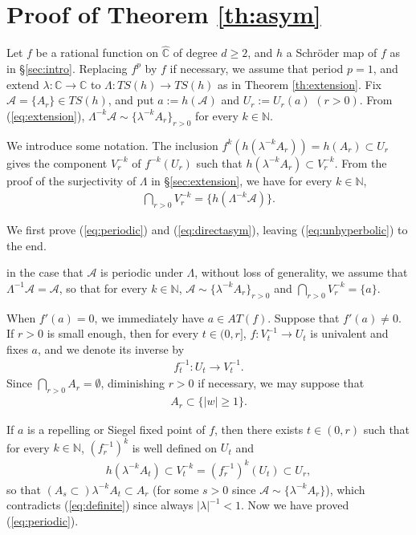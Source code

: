 \documentclass[a4paper,12pt]{amsart}
\theoremstyle{plain}
\theoremstyle{definition}
\theoremstyle{remark}
\numberwithin{equation}{section}
\begin{document}
\section{Proof of Theorem \ref{th:asym}}\label{sec:Schroder}

Let $f$ be a rational function on ${\hat{\mathbb{C}}}$ of degree $d\ge 2$,
and $h$ a Schr\"oder map of $f$ as in \S \ref{sec:intro}.
Replacing $f^p$ by $f$ if necessary, 
we assume that period $p=1$, and
extend $\lambda:{\mathbb{C}}\to{\mathbb{C}}$ to $\Lambda:{\mathit{TS}}(h)\to{\mathit{TS}}(h)$ as
in Theorem \ref{th:extension}.
Fix $\mathcal{A}=\{A_r\}\in{\mathit{TS}}(h)$, and 
put $a:=h(\mathcal{A})$ and $U_r:=U_r(a)$ $(r>0)$.
From (\ref{eq:extension}),
$\Lambda^{-k}\mathcal{A}\sim\{\lambda^{-k}A_r\}_{r>0}$ for every $k\in{\mathbb{N}}$.

We introduce some notation.
The inclusion $f^k(h(\lambda^{-k}A_r))=h(A_r)\subset U_r$
gives the component $V^{-k}_r$ of $f^{-k}(U_r)$ such that 
$h(\lambda^{-k}A_r)\subset V^{-k}_r$. From the proof of 
the surjectivity of $\Lambda$ in \S \ref{sec:extension},
we have for every $k\in{\mathbb{N}}$,
\begin{gather*}
 \bigcap_{r>0}V^{-k}_r=\{h(\Lambda^{-k}\mathcal{A})\}.
\end{gather*}

We first prove (\ref{eq:periodic}) and (\ref{eq:directasym}),
leaving (\ref{eq:unhyperbolic}) to the end.

{\smallskip {}\nopagebreak[4]}
in the case that $\mathcal{A}$ is periodic under $\Lambda$,
without loss of generality,
we assume that $\Lambda^{-1}\mathcal{A}=\mathcal{A}$,
so that for every $k\in{\mathbb{N}}$, $\mathcal{A}\sim\{\lambda^{-k}A_r\}_{r>0}$
and $\bigcap_{r>0}V^{-k}_r=\{a\}$.

When $f'(a)=0$, we immediately have $a\in{\mathit{AT}}(f)$. 
Suppose that $f'(a)\neq 0$. If $r>0$ is small enough,
then for every $t\in(0,r]$, $f:V^{-1}_t\to U_t$ is univalent
and fixes $a$, and we denote its inverse by 
\begin{gather*}
 f^{-1}_t:U_t\to V^{-1}_t.
\end{gather*}
Since $\bigcap_{r>0}A_r=\emptyset$, 
diminishing $r>0$ if necessary, we may suppose that 
\begin{gather}
 A_r\subset\{|w|\ge 1\}.\label{eq:definite}
\end{gather}

If $a$ is a repelling or Siegel fixed point of $f$,
then there exists $t\in(0,r)$ such that 
for every $k\in{\mathbb{N}}$, $(f^{-1}_r)^k$ is well defined on $U_t$ and 
\begin{gather*}
 h(\lambda^{-k}A_t)\subset V^{-k}_t=(f^{-1}_r)^k(U_t)\subset U_r,
\end{gather*}
so that $(A_s\subset)\lambda^{-k}A_t\subset A_r$ (for some $s>0$
since $\mathcal{A}\sim\{\lambda^{-k}A_r\}$),
which contradicts (\ref{eq:definite}) since always $|\lambda|^{-1}<1$.
Now we have proved (\ref{eq:periodic}). 
 
\end{document}
